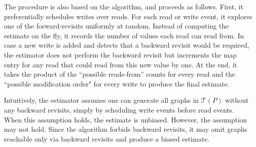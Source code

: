 %

The procedure is also based on the \trust algorithm, and proceeds as follows.
First, it preferentially schedules writes over reads.
For each read or write event, it explores one of the forward-revisits uniformly at random. 
Instead of computing the estimate on the fly, it records the number of values each read can read from. 
In case a new write is added and \trust detects that a backward revisit would be required, the estimator
does not perform the backward revisit but increments the map entry for any read that could read from this new value by one. 
At the end, it takes the product of the ``possible reads-from'' counts for every read and the ``possible modification order" 
for every write to produce the final estimate.

Intuitively, the estimator assumes one can generate all graphs in $\mathcal{T}(P)$ 
without any backward revisits, simply by scheduling write events before read events.
When this assumption holds, the estimate is unbiased. 
However, the assumption may not hold. 
Since the algorithm forbids backward revisits, it may omit graphs 
reachable only via backward revisits and produce a biased estimate.
